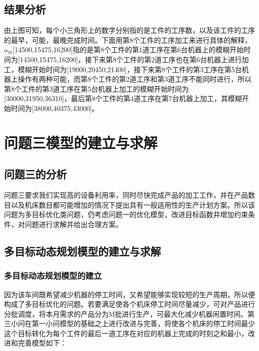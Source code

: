 \documentclass{whutmod}
\begin{document}
\begin{spacing}{1.2}
    
    
    \subsection{结果分析}
    由上图可知，每个小三角形上的数字分别指的是工件的工序数，以及该工件的工序的最早，可能，最晚完成时间。下面用第8个工件的工序加工来进行具体的解释，$o_{70}$[14500,15475,16200]指的是第8个工件的第1道工序在第6台机器上的模糊开始时间为[14500,15475,16200]，接下来第8个工件的第2道工序也在第6台机器上进行加工，模糊开始时间为[19000,20450,21400]，接下来第8个工件的第3工序在第5台机器上操作有两种可能，而第8个工件的第2道工序和第3道工序不能同时进行，所以第8个工件的第3道工序在第5台机器上加工的模糊开始时间为[30000,31950,36310]，最后第8个工件的第4道工序在第7台机器上加工，其模糊开始时间为[38000,40375,43000]。
    
     
    
   

    
    \section{问题三模型的建立与求解}
    \subsection{问题三的分析}


问题三要求我们实现高的设备利用率，同时尽快完成产品的加工工作，并在产品数目以及机床数目都可能增加的情况下提出具有一般适用性的生产计划方案。所以该问题为多目标优化类问题，仍考虑问题一的优化模型，改进目标函数并增加约束条件，对问题进行求解并给出合理方案。


    
    
    \subsection{多目标动态规划模型的建立与求解}
   \subsubsection{多目标动态规划模型的建立}
   
     因为该车间既希望减少机器的停工时间，又希望能够实现较短的生产周期，所以便构成了多目标优化\cite{6}的问题。若要满足使各个机床停工时间尽量减少，可对产品进行分批调度，将本月需求的产品分为M批进行生产，可最大化减少机器闲置时间。第三小问在第一小问模型的基础之上进行改进与完善，将使各个机床的停工时间最少这个目标转化为每个工件的最后一道工序在对应的机器上完成的时刻之和最小，改进和完善模型如下：


\end{spacing}
\end{document}
